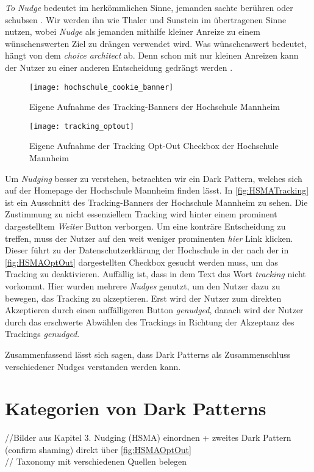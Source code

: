 \documentclass[conference,compsoc,final,a4paper]{IEEEtran}
\begin{document}
\textit{To Nudge} bedeutet im herkömmlichen Sinne, jemanden sachte berühren oder schubsen \autocite{MerriamWebsterNudge}. Wir werden ihn wie Thaler und Sunstein im übertragenen Sinne nutzen, wobei \textit{Nudge} als jemanden mithilfe kleiner Anreize zu einem wünschenswerten Ziel zu drängen verwendet wird. Was wünschenswert bedeutet, hängt von dem \textit{choice architect} ab. Denn schon mit nur kleinen Anreizen kann der Nutzer zu einer anderen Entscheidung gedrängt werden \autocite{Narayanan2020}.

\begin{figure}[!ht]
\centering
\texttt{[image: hochschule\_cookie\_banner]}
\caption{Eigene Aufnahme des Tracking-Banners der Hochschule Mannheim~\autocite{HSMAWebsite2021}}
\label{fig:HSMATracking}
\end{figure}

\begin{figure}[!ht]
\centering
\texttt{[image: tracking\_optout]}
\caption{Eigene Aufnahme der Tracking Opt-Out Checkbox der Hochschule Mannheim~\autocite{HSMAWebsite2021}}
\label{fig:HSMAOptOut}
\end{figure}

Um \textit{Nudging} besser zu verstehen, betrachten wir ein Dark Pattern, welches sich auf der Homepage der Hochschule Mannheim finden lässt. In \autoref{fig:HSMATracking} ist ein Ausschnitt des Tracking-Banners der Hochschule Mannheim zu sehen. Die Zustimmung zu nicht essenziellem Tracking wird hinter einem prominent dargestelltem \textit{Weiter} Button verborgen. Um eine konträre Entscheidung zu treffen, muss der Nutzer auf den weit weniger prominenten \textit{hier} Link klicken. Dieser führt zu der Datenschutzerklärung der Hochschule in der nach der in \autoref{fig:HSMAOptOut} dargestellten Checkbox gesucht werden muss, um das Tracking zu deaktivieren. Auffällig ist, dass in dem Text das Wort \textit{tracking} nicht vorkommt. Hier wurden mehrere \textit{Nudges} genutzt, um den Nutzer dazu zu bewegen, das Tracking zu akzeptieren. Erst wird der Nutzer zum direkten Akzeptieren durch einen auffälligeren Button \textit{genudged}, danach wird der Nutzer durch das erschwerte Abwählen des Trackings in Richtung der Akzeptanz des Trackings \textit{genudged}.

Zusammenfassend lässt sich sagen, dass Dark Patterns als Zusammenschluss verschiedener Nudges verstanden werden kann.

\section{Kategorien von Dark Patterns}
//Bilder aus Kapitel 3. Nudging (HSMA) einordnen + zweites Dark Pattern (confirm shaming) direkt über \autoref{fig:HSMAOptOut}\\
// Taxonomy mit verschiedenen Quellen belegen \autocite*{Gray_2018,M.Bhoot2020,Brignull}
\end{document}
